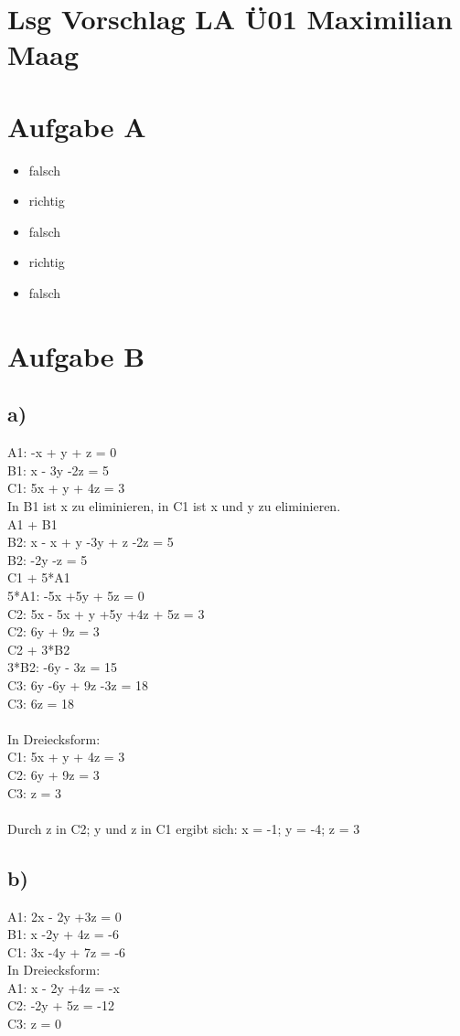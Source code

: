 \documentclass{article}
\begin{document}
	\section*{Lsg Vorschlag LA Ü01 Maximilian Maag}
	\section*{Aufgabe A}
	\begin{itemize}
		\item falsch
		\item richtig
		\item falsch
		\item richtig
		\item falsch
	\end{itemize}
	\section*{Aufgabe B}
	\subsection*{a)}
	A1: -x + y + z = 0 \\
	B1: x - 3y -2z = 5 \\
	C1: 5x + y + 4z = 3 \\
	In B1 ist x zu eliminieren, in C1 ist x und y zu eliminieren. \\
	A1 + B1 \\
	B2: x - x + y -3y + z -2z = 5 \\
	B2: -2y -z = 5 \\
	C1 + 5*A1 \\
	5*A1: -5x +5y + 5z = 0 \\
	C2: 5x - 5x + y +5y +4z + 5z = 3 \\
	C2:  6y + 9z = 3 \\
	C2 + 3*B2 \\
	3*B2: -6y - 3z = 15 \\
	C3: 6y -6y + 9z -3z = 18 \\
	C3: 6z = 18 \\ \\
	In Dreiecksform: \\
	C1: 5x + y + 4z = 3 \\
	C2: 6y + 9z = 3 \\
	C3: z = 3 \\ \\
	Durch z in C2; y und z in C1 ergibt sich:
	x = -1; y = -4; z = 3 \\
	
	\subsection*{b)}
	A1: 2x - 2y +3z = 0 \\
	B1: x -2y + 4z = -6 \\
	C1: 3x -4y + 7z = -6 \\
	In Dreiecksform: \\
	A1: x - 2y +4z = -x \\
	C2: -2y + 5z = -12 \\
	C3: z = 0 \\
\end{document}
